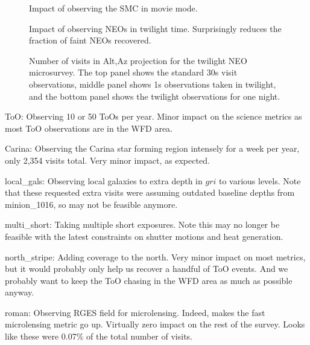 \begin{figure}
\caption{Impact of observing the SMC in movie mode.  \label{fig:smc}}
\end{figure}


\begin{figure}
\caption{Impact of observing NEOs in twilight time. Surprisingly reduces the fraction of faint NEOs recovered. \label{fig:twilight}}
\end{figure}

\begin{figure}
\caption{Number of visits in Alt,Az projection for the twilight NEO microsurvey. The top panel shows the standard 30s visit observations, middle panel shows 1s observations taken in twilight, and the bottom panel shows the twilight observations for one night. \label{fig:twi_maps}}
\end{figure}


ToO: Observing 10 or 50 ToOs per year. Minor impact on the science metrics as most ToO observations are in the WFD area.


Carina:  Observing the Carina star forming region intensely for a week per year, only 2,354 visits total.  Very minor impact, as expected.


local\_gals:  Observing local galaxies to extra depth in $gri$ to various levels. Note that these requested extra visits were assuming outdated baseline depths from minion\_1016, so may not be feasible anymore.

multi\_short:  Taking multiple short exposures. Note this may no longer be feasible with the latest constraints on shutter motions and heat generation.

north\_stripe:  Adding coverage to the north. Very minor impact on most metrics, but it would probably only help us recover a handful of ToO events. And we probably want to keep the ToO chasing in the WFD area as much as possible anyway.

roman: Observing RGES field for microlensing. Indeed, makes the fast microlensing metric go up. Virtually zero impact on the rest of the survey. Looks like these were 0.07\% of the total number of visits. 

